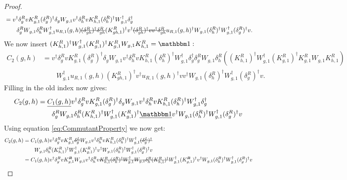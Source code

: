 \documentclass[11pt,a4paper,twoside]{article}
\numberwithin{equation}{section}
\begin{document}
\begin{proof}
\begin{align}
			&=v^\dagger \delta_g^R v K_{g,1}^R (\delta_g^R)^\dagger \delta_g W_{g,1}v^\dagger \delta_h^R v K_{h,1}^R (\delta_h^R)^\dagger W_{g,1}^\dagger \delta_g^\dagger\\
			\nonumber
			&\qquad \delta_g^R W_{g,1}\delta_h^R W_{g,1}^\dagger u_{R,1}(g,h)\stkout{(\delta_{gh}^R)^\dagger \delta_{gh}^R} (K_{gh,1}^R)^\dagger v^\dagger \stkout{(\delta_{gh}^R)^\dagger v  v^\dagger \delta^R_{gh}} u_{R,1}(g,h)^\dagger W_{g,1}(\delta^R_h)^\dagger W_{g,1}^\dagger(\delta_g^R)^\dagger v.
		\end{align}
		We now insert $(K_{h,1}^R)^\dagger W_{g,1}^\dagger (K_{g,1}^R)^\dagger K_{g,1}^R W_{g,1}K_{h,1}^R=\id:$
		\begin{align}
			\nonumber
			C_2(g,h)&=v^\dagger \delta_g^R v K_{g,1}^R (\delta_g^R)^\dagger \delta_g W_{g,1}v^\dagger \delta_h^R v K_{h,1}^R (\delta_h^R)^\dagger W_{g,1}^\dagger \delta_g^\dagger\delta_g^R W_{g,1}\delta_h^R \left((K_{h,1}^R)^\dagger W_{g,1}^\dagger (K_{g,1}^R)^\dagger K_{g,1}^R W_{g,1}K_{h,1}^R\right)\\	
			&\qquad  W_{g,1}^\dagger u_{R,1}(g,h) (K_{gh,1}^R)^\dagger v^\dagger u_{R,1}(g,h)^\dagger v v^\dagger W_{g,1}(\delta^R_h)^\dagger W_{g,1}^\dagger(\delta_g^R)^\dagger v.
		\end{align}
		Filling in the old index now gives:
		\begin{align}
			C_2(g,h)&=\underline{C_1(g,h)}v^\dagger \delta_g^R v K_{g,1}^R (\delta_g^R)^\dagger \delta_g W_{g,1}v^\dagger \delta_h^R v K_{h,1}^R (\delta_h^R)^\dagger W_{g,1}^\dagger \delta_g^\dagger\\
			\nonumber
			&\qquad \delta_g^R W_{g,1}\delta_h^R (K_{h,1}^R)^\dagger W_{g,1}^\dagger (K_{g,1}^R)^\dagger \underline{\id} v^\dagger W_{g,1}(\delta^R_h)^\dagger W_{g,1}^\dagger(\delta_g^R)^\dagger v
		\end{align}
		Using equation \eqref{eq:CommutantProperty} we now get:
		\begin{align}
			C_2(g,h)&=C_1(g,h)v^\dagger \delta_g^R v K_{g,1}^R \stkout{\delta_g^L} W_{g,1}v^\dagger \delta_h^R v K_{h,1}^R (\delta_h^R)^\dagger W_{g,1}^\dagger \stkout{(\delta_g^L)^\dagger}\\
			\nonumber
			&\qquad  W_{g,1}\delta_h^R (K_{h,1}^R)^\dagger W_{g,1}^\dagger (K_{g,1}^R)^\dagger v^\dagger W_{g,1}(\delta^R_h)^\dagger W_{g,1}^\dagger(\delta_g^R)^\dagger v\\
			\nonumber
			&=C_1(g,h)v^\dagger \delta_g^R v K_{g,1}^\stkout{R} W_{g,1}v^\dagger \delta_h^R v \stkout{K_{h,1}^R (\delta_h^R)^\dagger W_{g,1}^\dagger W_{g,1}\delta_h^R (K_{h,1}^R)^\dagger} W_{g,1}^\dagger (K_{g,1}^\stkout{R})^\dagger v^\dagger W_{g,1}(\delta^R_h)^\dagger W_{g,1}^\dagger(\delta_g^R)^\dagger v\\

\end{align}
\end{proof}
\end{document}
